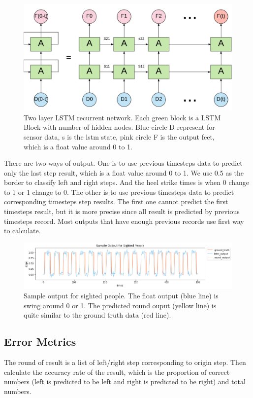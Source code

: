 \documentclass[11pt]{article}
\begin{document}
\begin{figure}[ht]
\centering
\includegraphics[scale=0.3]{LSTM3}
\caption{Two layer LSTM recurrent network. Each green block is a LSTM Block with number of hidden nodes. Blue circle D represent for sensor data, s is the lstm state, pink circle F is the output feet, which is a float value around 0 to 1.}
\label{fig:LSTM}
\end{figure}


There are two ways of output. One is to use previous timesteps data to predict only the last step result, which is a float value around 0 to 1. We use 0.5 as the border to classify left and right steps. And the heel strike times is when 0 change to 1 or 1 change to 0. The other is to use previous timesteps data to predict corresponding timesteps step results. The first one cannot predict the first timesteps result, but it is more precise since all result is predicted by previous timesteps record. Most outputs that have enough previous records use first way to calculate.


\begin{figure}[ht]
\centering
\includegraphics[scale=0.5]{output_sighted}
\caption{Sample output for sighted people. The float output (blue line) is swing around 0 or 1. The predicted round ouput (yellow line) is quite similar to the ground truth data (red line).}
\label{fig:output_sighted}
\end{figure}



\subsection{Error Metrics}
The round of result is a list of left/right step corresponding to origin step. Then calculate the accuracy rate of the result, which is the proportion of correct numbers (left is predicted to be left and right is predicted to be right) and total numbers.
\end{document}
